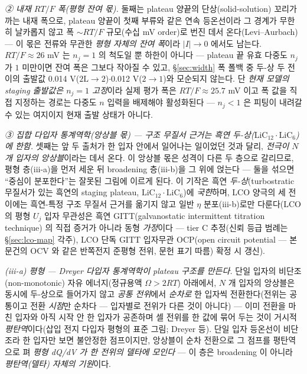 \documentclass[11pt,a4paper]{article}
\begin{document}
\emph{② 내재 $RT/F$ 폭(평형 잔여 몫).} 둘째는 plateau 양끝의 단상(solid-solution) 꼬리가 까는 내재 폭으로, plateau
양끝이 첫째 부류와 같은 연속 등온선이라 그 경계가 무한히 날카롭지 않고 폭 $\sim RT/F$ 규모(수십 mV order)로 번진 데서
온다(Levi--Aurbach\cite{leviaurbach1999}) — 이 몫은 전류와 무관한 \emph{평형 자체의 잔여 폭}이라 $|I|\!\to\!0$ 에서도
남는다. $RT/F\!\approx\!26$ mV 는 $n_j{=}1$ 의 척도일 뿐 하한이 아니다 — plateau 끝 유효 다중도 $n_j$ 가
$1$ 미만이면 잔여 폭은 그보다 작아질 수 있고, \S\ref{sec:width} 폭 폴백 중 두-상 두 전이의 출발값
0.014 V($2\mathrm L\!\to\!2$)$\cdot$0.012 V($2\!\to\!1$)와 모순되지 않는다. 단 \emph{현재 모델의 staging
출발값은 $n_j{=}1$ 고정}이라 실제 평가 폭은 $RT/F\!\approx\!25.7$ mV 이고 폭 값을 직접 지정하는 경로는 다중도
$n$ 입력을 배제해야 활성화된다 — $n_j\!<\!1$ 은 피팅이 내려갈 수 있는 여지이지 현재 출발 상태가 아니다.

\emph{③ 집합 다입자 통계역학(앙상블 몫) — 구조 무질서 근거는 흑연 두-상($\mathrm{LiC_{12}}\cdot\mathrm{LiC_6}$)에 한함.} 셋째는 앞 두 출처가
한 입자 안에서 일어나는 일이었던 것과 달리, \emph{전극이 $N$ 개 입자의 앙상블}이라는 데서 온다. 이 앙상블 몫은 성격이
다른 두 층으로 갈리므로, 평형 층(iii-a)을 먼저 세운 뒤 broadening 층(iii-b)을 그 위에 얹는다 — 둘을 섞으면 ``중심이
분포한다''는 잘못된 그림에 이르게 된다. 이 기작은 흑연 \emph{두-상}(turbostratic 무질서가 있는 흑연의 staging
plateau, $\mathrm{LiC_{12}}\cdot\mathrm{LiC_6}$)에 \emph{국한}하며, LCO 양극의 세 전이에는 흑연-특정 구조 무질서
근거를 옮기지 않고 일반 $\eta$ 분포(iii-b)로만 다룬다(LCO 의 평형 $U_j$ 입자 무관성은 흑연
GITT(galvanostatic intermittent titration technique)\cite{park2021} 의 직접 증거가 아니라 동형
\emph{가정}이다 — tier C 추정(신뢰 등급 범례는 \S\ref{sec:lco-map} 각주), LCO 단독 GITT 입자무관 OCP(open
circuit potential — 본 문건의 OCV 와 같은 반쪽전지 준평형 전위, 문헌 표기 따름) 확정 시 갱신).

\emph{(iii-a) 평형 — Dreyer 다입자 통계역학이 \emph{plateau 구조}를 만든다.} 단일 입자의 비단조(non-monotonic) 자유
에너지(정규용액 $\Omega>2RT$) 아래에서, $N$ 개 입자의 앙상블은 동시에 두-상으로 들어가지 않고 \emph{공통 전위}에서
\emph{순차로} 한 입자씩 전환한다(전위는 공통이고 전환 \emph{시점}만 순차다 — 입자별로 전위가 다른 것이 아니다) —
이미 전환을 마친 입자와 아직 시작 안 한 입자가 공존하며 셀 전위를 한 값에 묶어 두는
것이 거시적 \emph{평탄역}이다(삽입 전지 다입자 평형의 표준 그림; Dreyer 등\cite{dreyer2010}).
단일 입자 등온선이 비단조라 한 입자만 보면 불안정한 점프이지만, 앙상블이 순차 전환으로 그 점프를
평탄역으로 펴 \emph{평형 dQ/dV 가 한 전위의 델타에 모인다} — 이 층은 broadening 이 아니라 \emph{평탄역(델타) 자체의 기원}이다.
\end{document}
